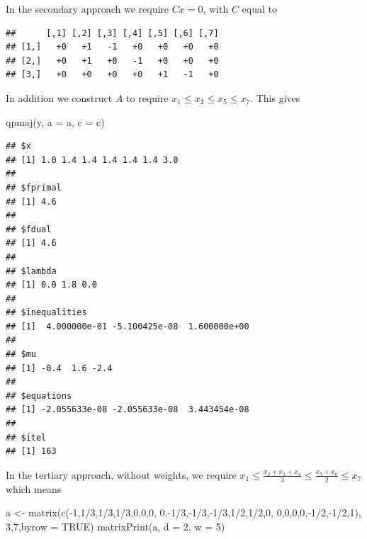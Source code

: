 \documentclass[
  12pt,
]{book}
\newenvironment{Shaded}{\begin{snugshade}}{\end{snugshade}}
\newcommand{\AttributeTok}[1]{\textcolor[rgb]{0.77,0.63,0.00}{#1}}
\newcommand{\ConstantTok}[1]{\textcolor[rgb]{0.00,0.00,0.00}{#1}}
\newcommand{\DecValTok}[1]{\textcolor[rgb]{0.00,0.00,0.81}{#1}}
\newcommand{\FunctionTok}[1]{\textcolor[rgb]{0.00,0.00,0.00}{#1}}
\newcommand{\NormalTok}[1]{#1}
\newcommand{\OtherTok}[1]{\textcolor[rgb]{0.56,0.35,0.01}{#1}}
\newcommand{\SpecialCharTok}[1]{\textcolor[rgb]{0.00,0.00,0.00}{#1}}
\theoremstyle{definition}
\theoremstyle{definition}
\theoremstyle{definition}
\theoremstyle{definition}
\theoremstyle{remark}
\begin{document}
In the secondary approach we require \(Cx=0\), with \(C\) equal to

\begin{verbatim}
##      [,1] [,2] [,3] [,4] [,5] [,6] [,7]
## [1,]   +0   +1   -1   +0   +0   +0   +0
## [2,]   +0   +1   +0   -1   +0   +0   +0
## [3,]   +0   +0   +0   +0   +1   -1   +0
\end{verbatim}

In addition we construct \(A\) to require \(x_1\leq x_2\leq x_5\leq x_7\). This gives

\begin{Shaded}
\begin{Highlighting}[]
\FunctionTok{qpmaj}\NormalTok{(y, }\AttributeTok{a =}\NormalTok{ a, }\AttributeTok{c =}\NormalTok{ c)}
\end{Highlighting}
\end{Shaded}

\begin{verbatim}
## $x
## [1] 1.0 1.4 1.4 1.4 1.4 1.4 3.0
## 
## $fprimal
## [1] 4.6
## 
## $fdual
## [1] 4.6
## 
## $lambda
## [1] 0.0 1.8 0.0
## 
## $inequalities
## [1]  4.000000e-01 -5.100425e-08  1.600000e+00
## 
## $mu
## [1] -0.4  1.6 -2.4
## 
## $equations
## [1] -2.055633e-08 -2.055633e-08  3.443454e-08
## 
## $itel
## [1] 163
\end{verbatim}

In the tertiary approach, without weights, we require
\(x_1\leq\frac{x_2+x_3+x_4}{3}\leq\frac{x_5+x_6}{2}\leq x_7\)
which means

\begin{Shaded}
\begin{Highlighting}[]
\NormalTok{a }\OtherTok{\textless{}{-}} \FunctionTok{matrix}\NormalTok{(}\FunctionTok{c}\NormalTok{(}\SpecialCharTok{{-}}\DecValTok{1}\NormalTok{,}\DecValTok{1}\SpecialCharTok{/}\DecValTok{3}\NormalTok{,}\DecValTok{1}\SpecialCharTok{/}\DecValTok{3}\NormalTok{,}\DecValTok{1}\SpecialCharTok{/}\DecValTok{3}\NormalTok{,}\DecValTok{0}\NormalTok{,}\DecValTok{0}\NormalTok{,}\DecValTok{0}\NormalTok{,}
              \DecValTok{0}\NormalTok{,}\SpecialCharTok{{-}}\DecValTok{1}\SpecialCharTok{/}\DecValTok{3}\NormalTok{,}\SpecialCharTok{{-}}\DecValTok{1}\SpecialCharTok{/}\DecValTok{3}\NormalTok{,}\SpecialCharTok{{-}}\DecValTok{1}\SpecialCharTok{/}\DecValTok{3}\NormalTok{,}\DecValTok{1}\SpecialCharTok{/}\DecValTok{2}\NormalTok{,}\DecValTok{1}\SpecialCharTok{/}\DecValTok{2}\NormalTok{,}\DecValTok{0}\NormalTok{,}
              \DecValTok{0}\NormalTok{,}\DecValTok{0}\NormalTok{,}\DecValTok{0}\NormalTok{,}\DecValTok{0}\NormalTok{,}\SpecialCharTok{{-}}\DecValTok{1}\SpecialCharTok{/}\DecValTok{2}\NormalTok{,}\SpecialCharTok{{-}}\DecValTok{1}\SpecialCharTok{/}\DecValTok{2}\NormalTok{,}\DecValTok{1}\NormalTok{),}
              \DecValTok{3}\NormalTok{,}\DecValTok{7}\NormalTok{,}\AttributeTok{byrow =} \ConstantTok{TRUE}\NormalTok{)}
\FunctionTok{matrixPrint}\NormalTok{(a, }\AttributeTok{d =} \DecValTok{2}\NormalTok{, }\AttributeTok{w =} \DecValTok{5}\NormalTok{)}
\end{Highlighting}
\end{Shaded}
\end{document}
